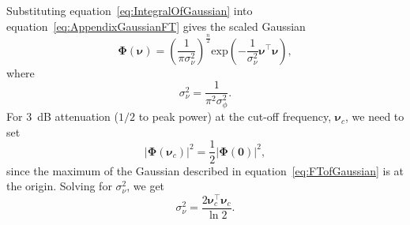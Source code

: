 \documentclass[review,authoryear,3p]{elsarticle}
\begin{document}
Substituting equation~\ref{eq:IntegralOfGaussian} into equation~\ref{eq:AppendixGaussianFT} gives the scaled Gaussian
\begin{equation}\label{eq:FTofGaussian}
\boldsymbol\Phi(\boldsymbol \nu)=\left(\frac{1}{\pi\sigma_{\nu}^2}\right)^{\frac{n}{2}}\mathrm{exp}\left(-\frac{1}{\sigma_{\nu}^2}\boldsymbol\nu^\top \boldsymbol\nu\right),
\end{equation} 
where 
\begin{equation}
	\sigma_{\nu}^2=\frac{1}{\pi^2\sigma_{\phi}^2}. 
\end{equation}
For $3$~dB attenuation ($1/2$ to peak power) at the cut-off frequency, $\boldsymbol\nu_c$, we need to set
\begin{equation}
 \left|\boldsymbol\Phi(\boldsymbol\nu_{c})\right|^2=\frac{1}{2}\left|\boldsymbol\Phi(\mathbf 0)\right|^2,
\end{equation}
since the maximum of the Gaussian described in equation~\ref{eq:FTofGaussian} is at the origin. Solving for $\sigma_{\nu}^2$, we get
\begin{equation}
 \sigma_{\nu}^2=\frac{2\boldsymbol\nu_{c}^\top \boldsymbol\nu_{c}}{\ln 2 }.
\end{equation}
\end{document}
